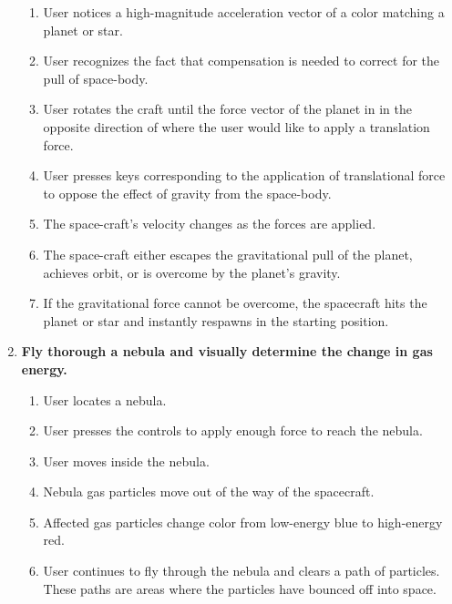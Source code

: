 \begin{enumerate}
\begin{enumerate}
  \item User notices a high-magnitude acceleration vector of a color matching a planet or star.

  \item User recognizes the fact that compensation is needed to correct for the pull of space-body.

  \item User rotates the craft until the force vector of the planet in in the opposite direction of where the user would like to apply a translation force.

  \item User presses keys corresponding to the application of translational force to oppose the effect of gravity from the space-body.

  \item The space-craft's velocity changes as the forces are applied.

  \item The space-craft either escapes the gravitational pull of the planet, achieves orbit, or is overcome by the planet's gravity.

  \item If the gravitational force cannot be overcome, the spacecraft hits the planet or star and instantly respawns in the starting position.

\end{enumerate}

\item\textbf{Fly thorough a nebula and visually determine the change in gas energy.}
\begin{enumerate}

  \item User locates a nebula.

  \item User presses the controls to apply enough force to reach the nebula.

  \item User moves inside the nebula.

  \item Nebula gas particles move out of the way of the spacecraft.

  \item Affected gas particles change color from low-energy blue to high-energy red.

  \item User continues to fly through the nebula and clears a path of particles.  These paths are areas where the particles have bounced off into space.


\end{enumerate}
\end{enumerate}
